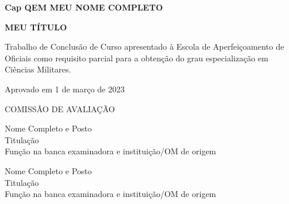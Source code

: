 \documentclass[12pt,a4paper]{article}
\def\mytitle{MEU TÍTULO}
\def\myname{Cap QEM MEU NOME COMPLETO}
\begin{document}
\begin{titlepage}
    \centering
    \doublespacing

    \vspace*{3cm} %

    \textbf{\myname} %

    \vspace*{2\baselineskip} %

    \textbf{\mytitle} %

    \vspace*{\baselineskip} %


    \vspace*{\baselineskip} %

    \begin{flushright}
    \begin{minipage}{0.5\textwidth}

        \singlespacing
        Trabalho de Conclusão de Curso apresentado à Escola de  Aperfeiçoamento de Oficiais como requisito parcial para a obtenção do grau especialização em Ciências Militares.
    \end{minipage}
    \end{flushright}
    \doublespacing

    \vspace*{2\baselineskip} %

    \begin{flushleft}
        Aprovado em 1 de março de 2023 %
    \end{flushleft}

    \vspace*{2\baselineskip} %

    COMISSÃO DE AVALIAÇÃO

    \begin{center}
        \makebox[10cm]{\hrulefill}
        \vspace{-0.5cm}
        \singlespacing
        Nome Completo e Posto \\
        Titulação \\
        Função na banca examinadora e instituição/OM de origem %

        \vspace{4\baselineskip}

        \makebox[10cm]{\hrulefill}
        \vspace{-0.5cm}
        \singlespacing
        Nome Completo e Posto \\
        Titulação \\
        Função na banca examinadora e instituição/OM de origem %
        \vspace{2\baselineskip}
    \end{center}
\end{titlepage}
\end{document}
